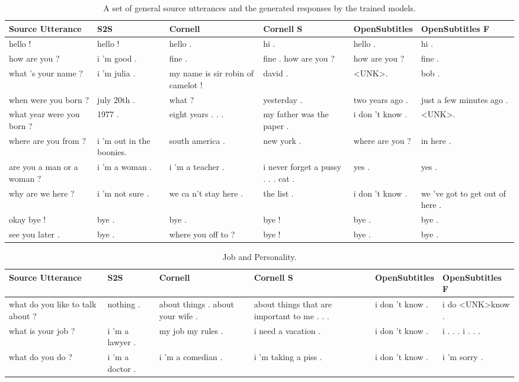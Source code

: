 \documentclass[12pt]{article}
\begin{document}
\begin{table}[H]
	\centering
	\begin{tabular}{|L{2.3cm}|L{2.3cm}|L{2.3cm}|L{2.3cm}|L{2.3cm}|L{2.3cm}|}
		\hline
		\textbf{Source Utterance} & \textbf{S2S} & \textbf{Cornell} & \textbf{Cornell S} & \textbf{OpenSubtitles} & \textbf{OpenSubtitles F}\\ \hline
		hello ! & hello ! & hello . & hi . & hello . & hi .
		\\ \hline
		how are you ? & i 'm good . & fine . & fine . how are you ? & how are you ? & fine .
		\\ \hline
		what 's your name ? & i ’m julia . & my name is sir robin of camelot !  & david . & \textless UNK\textgreater . & bob . 
		\\ \hline
		when were you born ? & july 20th . & what ? & yesterday . & two years ago . & just a few minutes ago .
		\\ \hline
		what year were you born ? & 1977 . & eight years . . . & my father was the paper . & i don 't know . & \textless UNK\textgreater .
		\\ \hline
		where are you from ? & i ’m out in the boonies. & south america . & new york . & where are you ? & in here .
		\\ \hline
		are you a man or a woman ? & i ’m a woman . & i 'm a teacher .  & i never forget a pussy . . . cat . & yes . & yes .
		\\ \hline
		why are we here ? & i ’m not sure . & we ca n't stay here .  & the list . & i don 't know . & we 've got to get out of here . 
		\\ \hline
		okay bye ! & bye . & bye . & bye ! & bye . & bye .
		\\ \hline
		see you later . & bye . & where you off to ?  & bye ! & bye . & bye .
		\\ \hline
		
	\end{tabular}
	\caption{A set of general source utterances and the generated responses by the trained models.}	
	\label{table:basicNCM}
\end{table}
\begin{table}[H]
	\centering
	\begin{tabular}{|L{2.3cm}|L{2.3cm}|L{2.3cm}|L{2.3cm}|L{2.3cm}|L{2.3cm}|}
		\hline
		\textbf{Source Utterance} & \textbf{S2S} & \textbf{Cornell} & \textbf{Cornell S} & \textbf{OpenSubtitles} & \textbf{OpenSubtitles F}\\ \hline
		what do you like to talk about ? & nothing . & about things . about your wife .  & about things that are important to me . . . & i don 't know . & i do \textless UNK\textgreater know .
		\\ \hline
		what is your job ? & i 'm a lawyer . & my job my rules .  & i need a vacation . & i don 't know . & i . . . i . . .
		\\ \hline
		what do you do ? & i 'm a doctor . & i 'm a comedian .   & i 'm taking a piss . & i don 't know . & i 'm sorry .
		\\ \hline
		
	\end{tabular}
	\caption{Job and Personality.}	
	\label{table:personalityNCM}
\end{table}
\end{document}
